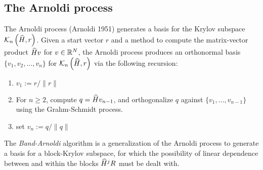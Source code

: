 \documentclass[letterpaper]{article}
\theoremstyle{remark}
\begin{document}
\begin{description}
   \subsection{The Arnoldi process}
   \label{sec:arnoldi}
   The Arnoldi process (Arnoldi 1951) generates a basis for the Krylov 
   subspace $\mathcal{K}_{n}\left({\widehat{H}},{r} \right)$. Given a start 
   vector $r$ and a method to compute the matrix-vector product $\widehat{H} v$ for
   $v\in\mathbb{R}^N$, the Arnoldi process produces an orthonormal basis 
   $\{v_1,v_2,\ldots,v_n\}$ for $\mathcal{K}_{n}\left({\widehat{H}},{r} \right)$ via the following 
   recursion: 
   \begin{enumerate}
   \item $v_1 := r/\|r\|$
   \item For $n\geq 2$, compute $q=\widehat{H} v_{n-1}$, and 
   orthogonalize $q$ against $\{v_1,\ldots ,v_{n-1}\}$ using the Grahm-Schmidt 
   process. 
   \item set $v_n:=q/\|q\|$
   \end{enumerate}
\begin{comment}
   More specifically, $n$ steps of the Arnoldi process produce the Arnoldi 
   decomposition of $\A$,
	\begin{equation}
	   \A V_n = V_n\A_n + \eta v_{n+1} e_n^{T},
	   \label{eq:arnoldi_decomp}
   \end{equation}
   where $V_n\in\C^{N\times n}$ is an orthogonal basis matrix for 
   $\krylov{n}{\A}{r}$, $\eta\in\C$, and the upper Hessenberg matrix 
   $\A_n\in\C^{n\times n}$ 
   is the projection of $\A$ on to that space, and can be considered a reduced-
   order approximation to $\A$.
   \end{comment}
   
   The \emph{Band-Arnoldi} algorithm \cite{AN} is a generalization of the Arnoldi 
   process to generate a basis for a block-Krylov subspace,
   for which the possibility of linear dependence between and within the blocks 
   $\widehat{H}^jR$ must be dealt with.  

   \begin{comment}
   \medskip
   \subsubsection{Reduced model via ``Hessenberg'' matrix $\bm{\A}$}
   \label{sec:hess}
   It follows from \eqref{eq:arnoldi_decomp} that $\A_n = V_n^*\A V$, so 
   motivated by \eqref{eq:tfunc_single_matrix} we define a formulation for the 
   reduced model transfer function
   \begin{equation}
   \tilde{H}_n(s) = \tilde{B}_n^*\left(I-(s-s_0)\A_n\right)^{-1}\tilde{R}_n,
   \label{eq:rm_hess}
   \end{equation}
   where
   \[
	\tilde{B}_n := V^*_nB \quad\textrm{and}\quad \tilde{R}_n := V^*_nR.
   \]


\end{comment}
\end{description}
\end{document}
